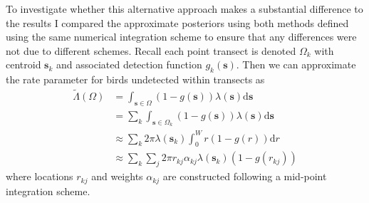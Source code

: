 \documentclass[12pt]{article}
\newcommand{\intd}{\mathrm{d}}
\newcommand{\bs}{\boldsymbol{s}}
\begin{document}
To investigate whether this alternative approach makes a substantial difference to the results I compared the approximate posteriors using both methods defined using the same numerical integration scheme to ensure that any differences were not due to different schemes. Recall each point transect is denoted $\Omega_k$ with centroid $\bs_k$ and associated detection function $g_k(\bs)$. Then we can approximate the rate parameter for birds undetected within transects as 
\begin{align*}
 \tilde{\Lambda}(\Omega) &= \int_{\bs \in \Omega}(1 - g(\bs))\lambda(\bs) \intd \bs \\
 &= \sum_k \int_{\bs \in \Omega_k} (1 - g(\bs))\lambda(\bs) \intd \bs \\
 &\approx \sum_k 2 \pi \lambda(\bs_k) \int_0^W r(1-g(r))\intd r \\
 &\approx \sum_k \sum_j 2 \pi r_{kj} \alpha_{kj} \lambda(\bs_k)(1 - g(r_{kj}))
\end{align*}  
where locations $r_{kj}$ and weights $\alpha_{kj}$ are constructed following a mid-point integration scheme.  
\end{document}
